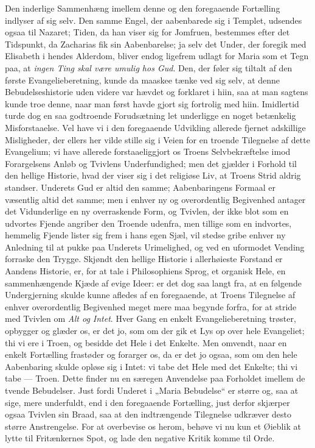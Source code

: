 \documentclass[12pt,a4paper]{book}
\begin{document}
Den inderlige Sammenhæng imellem denne og den foregaaende Fortælling indlyser
af sig selv. Den samme Engel, der aabenbarede sig i Templet, udsendes ogsaa
til Nazaret; Tiden, da han viser sig for Jomfruen, bestemmes efter det
Tidspunkt, da Zacharias fik sin Aabenbarelse; ja selv det Under, der foregik
med Elisabeth i hendes Alderdom, bliver endog ligefrem udlagt for Maria som
et Tegn paa, at \emph{ingen Ting skal være umulig hos Gud}. Den, der føler
sig tiltalt af den første Evangelieberetning, kunde da maaskee tænke ved sig
selv, at denne Bebudelseshistorie uden videre var hævdet og forklaret i hiin,
saa at man sagtens kunde troe denne, naar man først havde gjort sig fortrolig
med hiin. Imidlertid turde dog en saa godtroende Forudsætning let underligge
en noget betænkelig Misforstaaelse. Vel have vi i den foregaaende Udvikling
allerede fjernet adskillige Misligheder, der ellers her vilde stille sig i
Veien for en troende Tilegnelse af dette Evangelium; vi have allerede
forstaaeliggjort os Troens Selvbekræftelse imod Forargelsens Anløb og
Tvivlens Underfundighed; men det gjælder i Forhold til den hellige Historie,
hvad der viser sig i det religiøse Liv, at Troens Strid aldrig standser.
Underets Gud er altid den samme; Aabenbaringens Formaal er væsentlig altid
det samme; men i enhver ny og overordentlig Begivenhed antager det
Vidunderlige en ny overraskende Form, og Tvivlen, der ikke blot som en
udvortes Fjende angriber den Troende udenfra, men tillige som en indvortes,
hemmelig Fjende lister sig frem i hans egen Sjæl, vil stedse gribe enhver ny
Anledning til at pukke paa Underets Urimelighed, og ved en uformodet Vending
forraske den Trygge. Skjøndt den hellige Historie i allerhøieste Forstand er
Aandens Historie, er, for at tale i Philosophiens Sprog, et organisk Hele, en
sammenhængende Kjæde af evige Ideer: er det dog saa langt fra, at en følgende
Undergjerning skulde kunne afledes af en foregaaende, at Troens Tilegnelse af
enhver overordentlig Begivenhed meget mere maa begynde forfra, for at stride
med Tvivlen om \emph{Alt og Intet}. Hver Gang en enkelt Evangelieberetning
trøster, opbygger og glæder os, er det jo, som om der gik et Lys op over hele
Evangeliet; thi vi ere i Troen, og besidde det Hele i det Enkelte. Men
omvendt, naar en enkelt Fortælling frastøder og forarger os, da er det jo
ogsaa, som om den hele Aabenbaring skulde opløse sig i Intet: vi tabe det
Hele med det Enkelte; thi vi tabe --- Troen. Dette finder nu en særegen
Anvendelse paa Forholdet imellem de tvende Bebudelser. Just fordi Underet i
„Maria Bebudelse“ er større
og, saa at sige, mere underfuldt, end i den foregaaende Fortælling, just
derfor skjærper ogsaa Tvivlen sin Braad, saa at den indtrængende Tilegnelse
udkræver desto større Anstrengelse. For at overbevise os herom, behøve vi nu
kun et Øieblik at lytte til Fritænkernes Spot, og lade den negative Kritik
komme til Orde.
\end{document}

